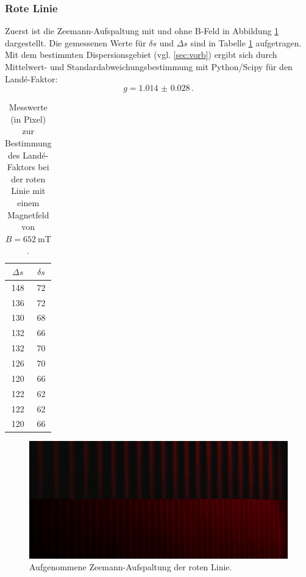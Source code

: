 \subsubsection{Rote Linie}
	Zuerst ist die Zeemann-Aufspaltung mit und ohne B-Feld in Abbildung \ref{fig:roterstern}
	dargestellt.
	Die gemessenen Werte für $\delta s$ und $\Delta s$ sind in Tabelle \ref{tab:rot} 
	aufgetragen. Mit dem bestimmten Dispersionsgebiet (vgl. \ref{sec:vorb}) ergibt sich 
	durch Mittelwert- und Standardabweichungsbestimmung mit Python/Scipy \cite{scipy} für
	den Landé-Faktor:
	\begin{equation*}
		g = \SI{1.014(28)} \, \text{.}
	\end{equation*}
	\begin{table}
		\centering
		\caption{Messwerte (in Pixel) zur Bestimmung des Landé-Faktors bei der roten Linie mit einem Magnetfeld von $B = \SI{652}{\milli\tesla}$.}
		\label{tab:rot}
		\begin{tabular}{c | c}
			\toprule
			$\Delta s$ & $\delta s$\\
			\midrule
			148 & 72 \\
			136 & 72 \\
			130 & 68 \\
			132 & 66 \\
			132 & 70 \\
			126 & 70 \\
			120 & 66 \\
			122 & 62 \\
			122 & 62 \\
			120 & 66 \\
			\bottomrule
		\end{tabular}
	\end{table}
\begin{figure}
	\centering
	\includegraphics[width=\textwidth]{ouurs/red_cropped.png}
	\caption{Aufgenommene Zeemann-Aufspaltung der roten Linie.}
	\label{fig:roterstern}
\end{figure}

